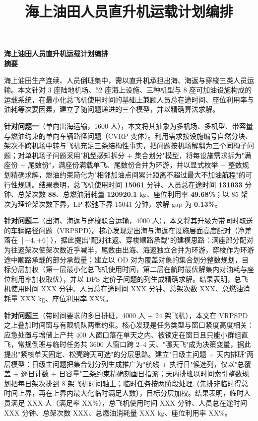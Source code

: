 \documentclass[zihao=-4,a4paper]{ctexart}
\title{海上油田人员直升机运载计划编排}
\author{}
\date{}
\begin{document}
\begin{center}
  {\LARGE\bfseries 海上油田人员直升机运载计划编排}\\[1.5em]
  {\Large\bfseries 摘\quad 要}
\end{center}
\vspace{0.8em}

海上油田生产连续、人员倒班集中，需以直升机承担出海、海返与穿梭三类人员运输。本文针对 3 座陆地机场、52 座海上设施、三种机型与 8 座可加油设施构成的运载系统，在最小化总飞机使用时间的基础上兼顾人员总在途时间、座位利用率与油耗等次要因素，建立了随问题递进的三个模型，并以精确算法求解。

\textbf{针对问题一}（单向出海运输，1600 人），本文将其抽象为多机场、多机型、带容量与燃油约束的单向车辆路径问题（CVRP 变体）。利用需求按设施编号自然分块、架次不跨机场中转与飞机充足三条结构性事实，把问题按机场解耦为三个同构子问题；对单机场子问题采用"机型感知拆分 + 集合划分"模型，将每设施需求拆为"满座份 + 尾数份"，满座份满载单飞、尾数份合并为环游，并以显式枚举 + 整数规划精确求解，燃油约束简化为"相邻加油点间累计距离不超过最大不加油航程"的可行性规则。结果表明，总飞机使用时间 \textbf{15061} 分钟、人员总在途时间 \textbf{131033} 分钟、总架次数 \textbf{88}、总燃油消耗量 \textbf{120920.1} kg、座位利用率 \textbf{49.68\%}；以 85 架次为理论架次数下界，LP 松弛下界 15041 分钟，求解 gap 为 \textbf{0.13\%}。

\textbf{针对问题二}（出海、海返与穿梭联合运输，4000 人），本文将其升级为带同时取送的车辆路径问题（VRPSPD）。核心发现是出海与海返在设施层面高度配对（净差落在 $[-4,+6]$），据此提出"配对往返、穿梭顺路承载"的建模思路：满座部分配对为往返架次使架次数近乎减半，尾数由出海、海返独立合并为环游，穿梭作为环游途中顺路承载的部分承载量；建立以 OD 对为覆盖对象的集合划分整数规划，目标分层加权（第一层最小化总飞机使用时间，第二层在航时最优解集内对油耗与座位利用率加权取优），并以 DFS 定价子问题的列生成精确求解。结果表明，总飞机使用时间 XXX 分钟、人员总在途时间 XXX 分钟、总架次数 XXX、总燃油消耗量 XXX kg、座位利用率 XX\%。

\textbf{针对问题三}（带时间要求的多日排班，4000 人 + 24 架飞机），本文在 VRPSPD 之上叠加时间窗与有限机队两重约束。核心发现是任务类型与窗口紧度高度相关：应急处置与增储上产共 400 人窗口落在单天之内、被锁定在窗日且只能小群组直飞，常规倒班与临时任务共 3600 人窗口跨 2--4 天、"哪天飞"成为决策变量，据此提出"紧核单天固定、松壳跨天可选"的分层思路。建立"日级主问题 + 天内排班"两层模型：日级主问题把集合划分列生成推广为"航线 + 执行日"候选列，仅以"总覆盖 + 逐日计数 + 日容量"三条约束精确刻画日指派；天内排班以时间索引整数规划把每日架次排到 8 架飞机时间轴上；临时任务按两阶段处理（先排非临时得总时间上界，再在上界内最大化临时满足人数），目标分层加权。结果表明，临时人员满足 XXX 人（满足率 XX\%），总飞机使用时间 XXX 分钟、人员总在途时间 XXX 分钟、总架次数 XXX、总燃油消耗量 XXX kg、座位利用率 XX\%。
\end{document}
